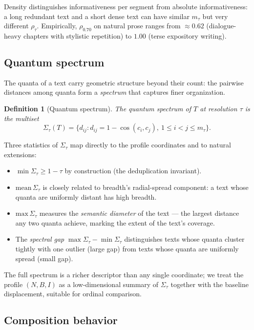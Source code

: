 \documentclass[11pt]{article}
\newtheorem{definition}{Definition}
\begin{document}
Density distinguishes informativeness per segment from absolute informativeness: a long redundant text and a short dense text can have similar $m_\tau$ but very different $\rho_\tau$. Empirically, $\rho_{0.70}$ on natural prose ranges from $\approx 0.62$ (dialogue-heavy chapters with stylistic repetition) to $1.00$ (terse expository writing).

\subsection{Quantum spectrum}

The quanta of a text carry geometric structure beyond their count: the pairwise distances among quanta form a \emph{spectrum} that captures finer organization.

\begin{definition}[Quantum spectrum]
The \emph{quantum spectrum} of $T$ at resolution $\tau$ is the multiset
\[
\Sigma_\tau(T) = \bigl\{ d_{ij} : d_{ij} = 1 - \cos(c_i, c_j),\ 1 \leq i < j \leq m_\tau \bigr\}.
\]
\end{definition}

Three statistics of $\Sigma_\tau$ map directly to the profile coordinates and to natural extensions:

\begin{itemize}
\item $\min \Sigma_\tau \geq 1 - \tau$ by construction (the deduplication invariant).
\item $\mathrm{mean}\, \Sigma_\tau$ is closely related to breadth's radial-spread component: a text whose quanta are uniformly distant has high breadth.
\item $\mathrm{max}\, \Sigma_\tau$ measures the \emph{semantic diameter} of the text --- the largest distance any two quanta achieve, marking the extent of the text's coverage.
\item The \emph{spectral gap} $\max\Sigma_\tau - \min\Sigma_\tau$ distinguishes texts whose quanta cluster tightly with one outlier (large gap) from texts whose quanta are uniformly spread (small gap).
\end{itemize}

The full spectrum is a richer descriptor than any single coordinate; we treat the profile $(N, B, I)$ as a low-dimensional summary of $\Sigma_\tau$ together with the baseline displacement, suitable for ordinal comparison.

\subsection{Composition behavior}
\end{document}
